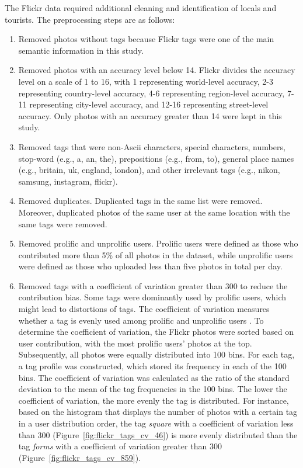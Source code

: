 \documentclass{article}
\theoremstyle{remark}
\begin{document}
The Flickr data required additional cleaning and identification of locals and tourists. The preprocessing steps are as follows:
\begin{enumerate}
    \item Removed photos without tags because Flickr tags were one of the main semantic information in this study.
    \item Removed photos with an accuracy level below 14. Flickr divides the accuracy level on a scale of 1 to 16, with 1 representing world-level accuracy, 2-3 representing country-level accuracy, 4-6 representing region-level accuracy, 7-11 representing city-level accuracy, and 12-16 representing street-level accuracy. Only photos with an accuracy greater than 14 were kept in this study.
    \item Removed tags that were non-Ascii characters, special characters, numbers, stop-word (e.g., a, an, the), prepositions (e.g., from, to), general place names (e.g., britain, uk, england, london), and other irrelevant tags (e.g., nikon, samsung, instagram, flickr).
    \item Removed duplicates. Duplicated tags in the same list were removed. Moreover, duplicated photos of the same user at the same location with the same tags were removed.
    \item Removed prolific and unprolific users. Prolific users were defined as those who contributed more than 5\% of all photos in the dataset, while unprolific users were defined as those who uploaded less than five photos in total per day.
    \item Removed tags with a coefficient of variation greater than 300 to reduce the contribution bias. Some tags were dominantly used by prolific users, which might lead to distortions of tags. The coefficient of variation measures whether a tag is evenly used among prolific and unprolific users \citep{hollenstein_exploring_2010}. To determine the coefficient of variation, the Flickr photos were sorted based on user contribution, with the most prolific users' photos at the top. Subsequently, all photos were equally distributed into 100 bins. For each tag, a tag profile was constructed, which stored its frequency in each of the 100 bins. The coefficient of variation was calculated as the ratio of the standard deviation to the mean of the tag frequencies in the 100 bins. The lower the coefficient of variation, the more evenly the tag is distributed. For instance, based on the histogram that displays the number of photos with a certain tag in a user distribution order, the tag \textit{square} with a coefficient of variation less than 300 (Figure~\ref{fig:flickr_tags_cv_46}) is more evenly distributed than the tag \textit{forms} with a coefficient of variation greater than 300 (Figure~\ref{fig:flickr_tags_cv_859}).

\end{enumerate}
\end{document}
